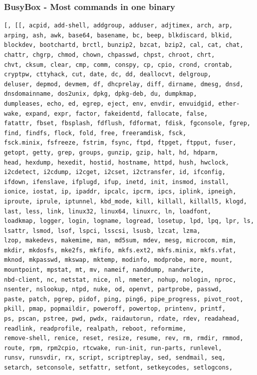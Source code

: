 \begin{frame}[fragile]
  \frametitle{BusyBox - Most commands in one binary}
  \tiny
  \begin{verbatim}
[, [[, acpid, add-shell, addgroup, adduser, adjtimex, arch, arp, arping, ash, awk, base64, basename, bc, beep, blkdiscard, blkid,
blockdev, bootchartd, brctl, bunzip2, bzcat, bzip2, cal, cat, chat, chattr, chgrp, chmod, chown, chpasswd, chpst, chroot, chrt,
chvt, cksum, clear, cmp, comm, conspy, cp, cpio, crond, crontab, cryptpw, cttyhack, cut, date, dc, dd, deallocvt, delgroup,
deluser, depmod, devmem, df, dhcprelay, diff, dirname, dmesg, dnsd, dnsdomainname, dos2unix, dpkg, dpkg-deb, du, dumpkmap,
dumpleases, echo, ed, egrep, eject, env, envdir, envuidgid, ether-wake, expand, expr, factor, fakeidentd, fallocate, false,
fatattr, fbset, fbsplash, fdflush, fdformat, fdisk, fgconsole, fgrep, find, findfs, flock, fold, free, freeramdisk, fsck,
fsck.minix, fsfreeze, fstrim, fsync, ftpd, ftpget, ftpput, fuser, getopt, getty, grep, groups, gunzip, gzip, halt, hd, hdparm,
head, hexdump, hexedit, hostid, hostname, httpd, hush, hwclock, i2cdetect, i2cdump, i2cget, i2cset, i2ctransfer, id, ifconfig,
ifdown, ifenslave, ifplugd, ifup, inetd, init, insmod, install, ionice, iostat, ip, ipaddr, ipcalc, ipcrm, ipcs, iplink, ipneigh,
iproute, iprule, iptunnel, kbd_mode, kill, killall, killall5, klogd, last, less, link, linux32, linux64, linuxrc, ln, loadfont,
loadkmap, logger, login, logname, logread, losetup, lpd, lpq, lpr, ls, lsattr, lsmod, lsof, lspci, lsscsi, lsusb, lzcat, lzma,
lzop, makedevs, makemime, man, md5sum, mdev, mesg, microcom, mim, mkdir, mkdosfs, mke2fs, mkfifo, mkfs.ext2, mkfs.minix, mkfs.vfat,
mknod, mkpasswd, mkswap, mktemp, modinfo, modprobe, more, mount, mountpoint, mpstat, mt, mv, nameif, nanddump, nandwrite,
nbd-client, nc, netstat, nice, nl, nmeter, nohup, nologin, nproc, nsenter, nslookup, ntpd, nuke, od, openvt, partprobe, passwd,
paste, patch, pgrep, pidof, ping, ping6, pipe_progress, pivot_root, pkill, pmap, popmaildir, poweroff, powertop, printenv, printf,
ps, pscan, pstree, pwd, pwdx, raidautorun, rdate, rdev, readahead, readlink, readprofile, realpath, reboot, reformime,
remove-shell, renice, reset, resize, resume, rev, rm, rmdir, rmmod, route, rpm, rpm2cpio, rtcwake, run-init, run-parts, runlevel,
runsv, runsvdir, rx, script, scriptreplay, sed, sendmail, seq, setarch, setconsole, setfattr, setfont, setkeycodes, setlogcons,

\end{verbatim}
\end{frame}
